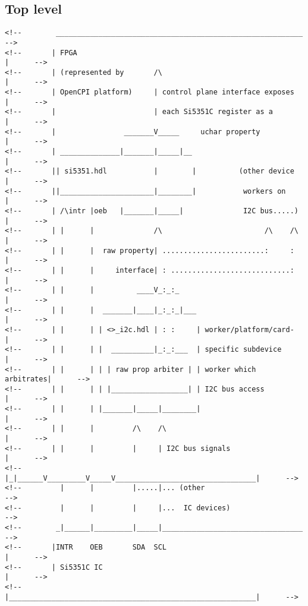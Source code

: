 \documentclass{article}
\begin{document}
\subsection*{Top level}
\begin{center}
\small
\begin{verbatim}
<!--        __________________________________________________________       -->
<!--       | FPGA                                                     |      -->
<!--       | (represented by       /\                                 |      -->
<!--       | OpenCPI platform)     | control plane interface exposes  |      -->
<!--       |                       | each Si5351C register as a       |      -->
<!--       |                _______V_____     uchar property          |      -->
<!--       | ______________|_______|_____|__                          |      -->
<!--       || si5351.hdl           |        |          (other device  |      -->
<!--       ||______________________|________|           workers on    |      -->
<!--       | /\intr |oeb   |_______|_____|              I2C bus.....) |      -->
<!--       | |      |              /\                        /\    /\ |      -->
<!--       | |      |  raw property| ........................:     :  |      -->
<!--       | |      |     interface| : ............................:  |      -->
<!--       | |      |          ____V_:_:_                             |      -->
<!--       | |      |  _______|____|_:_:_|___                         |      -->
<!--       | |      | | <>_i2c.hdl | : :     | worker/platform/card-  |      -->
<!--       | |      | |  __________|_:_:___  | specific subdevice     |      -->
<!--       | |      | | | raw prop arbiter | | worker which arbitrates|      -->
<!--       | |      | | |__________________| | I2C bus access         |      -->
<!--       | |      | |_______|_____|________|                        |      -->
<!--       | |      |         /\    /\                                |      -->
<!--       | |      |         |     | I2C bus signals                 |      -->
<!--       |_|______V_________V_____V_________________________________|      -->
<!--         |      |         |.....|... (other                              -->
<!--         |      |         |     |...  IC devices)                        -->
<!--        _|______|_________|_____|_________________________________       -->
<!--       |INTR    OEB       SDA  SCL                                |      -->
<!--       | Si5351C IC                                               |      -->
<!--       |__________________________________________________________|      -->
\end{verbatim}
\normalsize
\end{center}\pagebreak
\end{document}
